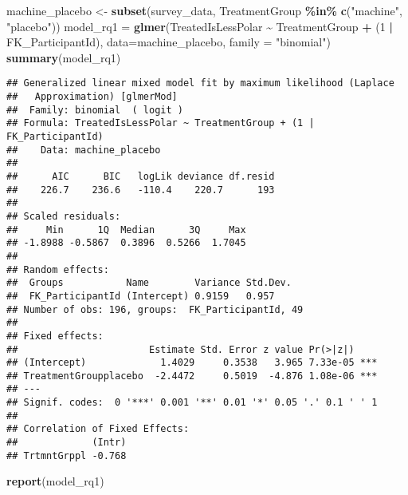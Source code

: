 \documentclass[
]{article}
\newenvironment{Shaded}{\begin{snugshade}}{\end{snugshade}}
\newcommand{\AttributeTok}[1]{\textcolor[rgb]{0.13,0.29,0.53}{#1}}
\newcommand{\DecValTok}[1]{\textcolor[rgb]{0.00,0.00,0.81}{#1}}
\newcommand{\FunctionTok}[1]{\textcolor[rgb]{0.13,0.29,0.53}{\textbf{#1}}}
\newcommand{\NormalTok}[1]{#1}
\newcommand{\OtherTok}[1]{\textcolor[rgb]{0.56,0.35,0.01}{#1}}
\newcommand{\SpecialCharTok}[1]{\textcolor[rgb]{0.81,0.36,0.00}{\textbf{#1}}}
\newcommand{\StringTok}[1]{\textcolor[rgb]{0.31,0.60,0.02}{#1}}
\begin{document}
\begin{Shaded}
\begin{Highlighting}[]
\NormalTok{machine\_placebo }\OtherTok{\textless{}{-}} \FunctionTok{subset}\NormalTok{(survey\_data, TreatmentGroup }\SpecialCharTok{\%in\%} \FunctionTok{c}\NormalTok{(}\StringTok{"machine"}\NormalTok{, }\StringTok{"placebo"}\NormalTok{))}
\NormalTok{model\_rq1 }\OtherTok{=} \FunctionTok{glmer}\NormalTok{(TreatedIsLessPolar }\SpecialCharTok{\textasciitilde{}}\NormalTok{ TreatmentGroup }\SpecialCharTok{+}\NormalTok{ (}\DecValTok{1} \SpecialCharTok{|}\NormalTok{ FK\_ParticipantId),}
              \AttributeTok{data=}\NormalTok{machine\_placebo, }\AttributeTok{family =} \StringTok{"binomial"}\NormalTok{)}
\FunctionTok{summary}\NormalTok{(model\_rq1)}
\end{Highlighting}
\end{Shaded}

\begin{verbatim}
## Generalized linear mixed model fit by maximum likelihood (Laplace
##   Approximation) [glmerMod]
##  Family: binomial  ( logit )
## Formula: TreatedIsLessPolar ~ TreatmentGroup + (1 | FK_ParticipantId)
##    Data: machine_placebo
## 
##      AIC      BIC   logLik deviance df.resid 
##    226.7    236.6   -110.4    220.7      193 
## 
## Scaled residuals: 
##     Min      1Q  Median      3Q     Max 
## -1.8988 -0.5867  0.3896  0.5266  1.7045 
## 
## Random effects:
##  Groups           Name        Variance Std.Dev.
##  FK_ParticipantId (Intercept) 0.9159   0.957   
## Number of obs: 196, groups:  FK_ParticipantId, 49
## 
## Fixed effects:
##                       Estimate Std. Error z value Pr(>|z|)    
## (Intercept)             1.4029     0.3538   3.965 7.33e-05 ***
## TreatmentGroupplacebo  -2.4472     0.5019  -4.876 1.08e-06 ***
## ---
## Signif. codes:  0 '***' 0.001 '**' 0.01 '*' 0.05 '.' 0.1 ' ' 1
## 
## Correlation of Fixed Effects:
##             (Intr)
## TrtmntGrppl -0.768
\end{verbatim}

\begin{Shaded}
\begin{Highlighting}[]
\FunctionTok{report}\NormalTok{(model\_rq1)}
\end{Highlighting}
\end{Shaded}
\end{document}
